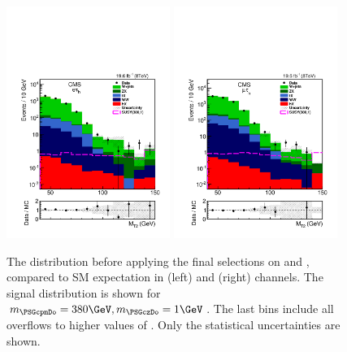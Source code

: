 \begin{figure}[!htb]
\centering
\includegraphics[width=0.475\textwidth]{Figure_002-a.pdf}
\includegraphics[width=0.475\textwidth]{Figure_002-b.pdf}
\caption{The \mttwo distribution before applying the final selections on \mttwo and \tauMT, compared to SM expectation in (left) \eTau and (right) \muTau channels. The signal distribution is shown for $m_{\PSGcpmDo}=380\GeV, m_{\PSGczDo}=1\GeV$. The last bins include all overflows to higher values of \mttwo. Only the statistical uncertainties are shown.}
\label{fig:mt2leptontau}
\end{figure}






